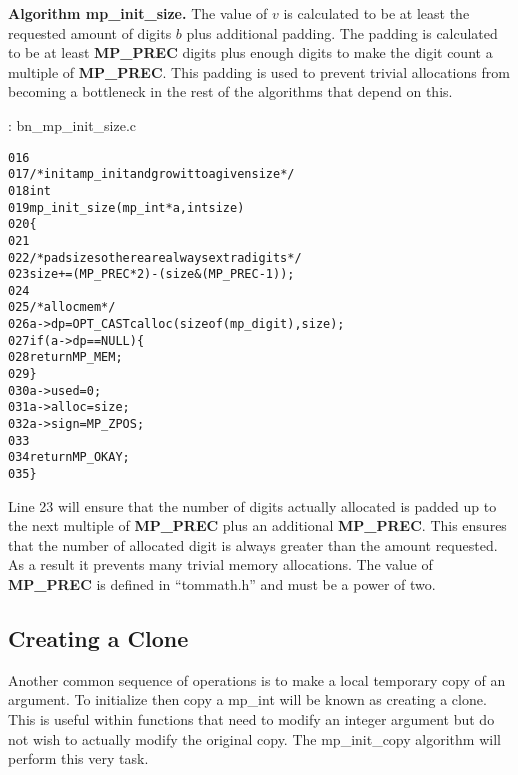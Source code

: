 \documentclass[b5paper]{book}
\begin{document}
\textbf{Algorithm mp\_init\_size.}
The value of $v$ is calculated to be at least the requested amount of digits $b$ plus additional padding.  The padding is calculated
to be at least \textbf{MP\_PREC} digits plus enough digits to make the digit count a multiple of \textbf{MP\_PREC}.  This padding is used to 
prevent trivial allocations from becoming a bottleneck in the rest of the algorithms that depend on this.

\vspace{+3mm}\begin{small}
\hspace{-5.1mm}{\bf File}: bn\_mp\_init\_size.c
\vspace{-3mm}
\begin{alltt}
016   
017   /* init a mp_init and grow it to a given size */
018   int
019   mp_init_size (mp_int * a, int size)
020   \{
021   
022     /* pad size so there are always extra digits */
023     size += (MP_PREC * 2) - (size & (MP_PREC - 1));    
024     
025     /* alloc mem */
026     a->dp = OPT_CAST calloc (sizeof (mp_digit), size);
027     if (a->dp == NULL) \{
028       return MP_MEM;
029     \}
030     a->used = 0;
031     a->alloc = size;
032     a->sign = MP_ZPOS;
033   
034     return MP_OKAY;
035   \}
\end{alltt}
\end{small}

Line 23 will ensure that the number of digits actually allocated is padded up to the next multiple of 
\textbf{MP\_PREC} plus an additional \textbf{MP\_PREC}.  This ensures that the number of allocated digit is 
always greater than the amount requested.  As a result it prevents many trivial memory allocations.  The value of 
\textbf{MP\_PREC} is defined in ``tommath.h'' and must be a power of two.

\subsection{Creating a Clone}
Another common sequence of operations is to make a local temporary copy of an argument.  To initialize then copy a mp\_int will be known as 
creating a clone.  This is useful within functions that need to modify an integer argument but do not wish to actually modify the original copy.  
The mp\_init\_copy algorithm will perform this very task.
\end{document}
